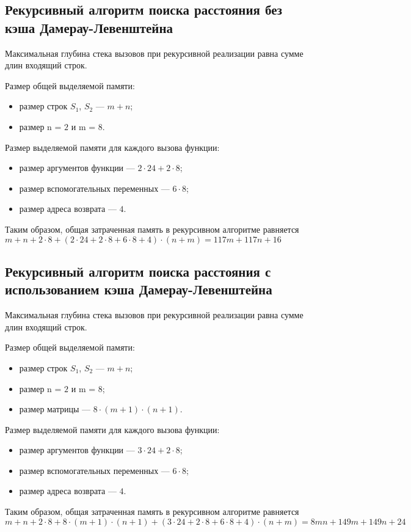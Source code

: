 \subsection{Рекурсивный алгоритм поиска расстояния без кэша Дамерау-Левенштейна}
Максимальная глубина стека вызовов при рекурсивной реализации равна сумме длин входящий строк.

Размер общей выделяемой памяти:
\begin{itemize}
	\item размер строк $S_1$, $S_2$ --- $m + n$;
	\item размер n = $2$ и m = $8$.
\end{itemize}

Размер выделяемой памяти для каждого вызова функции:
\begin{itemize}
	\item размер аргументов функции --- $2 \cdot 24 + 2 \cdot 8$;
	\item размер вспомогательных переменных --- $6 \cdot 8$;
	\item размер адреса возврата --- $4$.
\end{itemize}
Таким образом, общая затраченная память в рекурсивном алгоритме равняется $m + n + 2 \cdot 8 + (2 \cdot 24 + 2 \cdot 8 + 6 \cdot 8 + 4) \cdot (n + m) = 117m + 117n + 16$

\subsection{Рекурсивный алгоритм поиска расстояния с использованием кэша Дамерау-Левенштейна}
Максимальная глубина стека вызовов при рекурсивной реализации равна сумме длин входящий строк.

Размер общей выделяемой памяти:
\begin{itemize}
	\item размер строк $S_1$, $S_2$ --- $m + n$;
	\item размер n = $2$ и m = $8$;
	\item размер матрицы --- $8 \cdot (m + 1) \cdot (n + 1)$.
\end{itemize}

Размер выделяемой памяти для каждого вызова функции:
\begin{itemize}
	\item размер аргументов функции --- $3 \cdot 24 + 2 \cdot 8$;
	\item размер вспомогательных переменных --- $6 \cdot 8$;
	\item размер адреса возврата --- $4$.
\end{itemize}
Таким образом, общая затраченная память в рекурсивном алгоритме равняется $m + n + 2 \cdot 8 + 8 \cdot (m + 1) \cdot (n + 1) + (3 \cdot 24 + 2 \cdot 8 + 6 \cdot 8 + 4) \cdot (n + m) = 8mn + 149m + 149n + 24$


